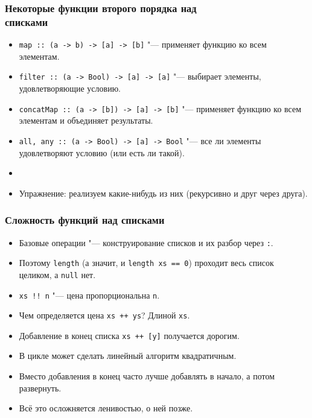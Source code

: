 \documentclass[11pt]{beamer}
\begin{document}
\begin{frame}[fragile]
  \frametitle{Некоторые функции второго порядка над\\ списками}
  \begin{itemize}
    \item \lstinline|map :: (a -> b) -> [a] -> [b]| \pause"--- применяет функцию ко всем элементам.
    \item \lstinline|filter :: (a -> Bool) -> [a] -> [a]| \pause"--- выбирает элементы, удовлетворяющие условию.
    \item \lstinline|concatMap :: (a -> [b]) -> [a] -> [b]| \pause"--- применяет функцию ко всем элементам и объединяет результаты.
    \item \lstinline|all, any :: (a -> Bool) -> [a] -> Bool| \pause"--- все ли элементы удовлетворяют условию (или есть ли такой).
          \pause
    \item[]
    \item Упражнение: реализуем какие-нибудь из них (рекурсивно и друг через друга).
  \end{itemize}
\end{frame}

\begin{frame}[fragile]
  \frametitle{Сложность функций над списками}
  \begin{itemize}
    \item Базовые операции "--- конструирование списков и их разбор через \lstinline|:|.
          \pause
    \item Поэтому \lstinline|length| (а значит, и \lstinline|length xs == 0|) проходит весь список целиком, а \lstinline|null| нет.
          \pause
    \item \lstinline|xs !! n| "--- цена пропорциональна \pause\lstinline|n|.
          \pause
    \item Чем определяется цена \lstinline|xs ++ ys|? \pause Длиной \lstinline|xs|.
          \pause
    \item Добавление в конец списка \lstinline|xs ++ [y]| получается дорогим.
    \item В цикле может сделать линейный алгоритм квадратичным.
          \pause
    \item Вместо добавления в конец часто лучше добавлять в начало, а потом развернуть.
          \pause
    \item Всё это осложняется ленивостью, о ней позже.
  \end{itemize}
\end{frame}
\end{document}
